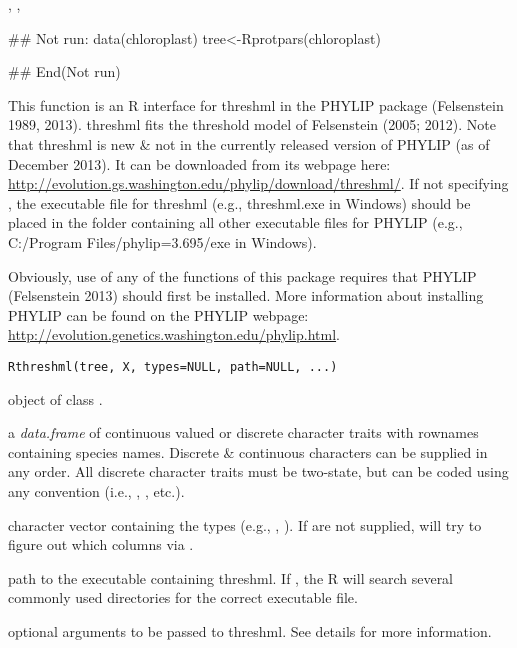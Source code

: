\documentclass[a4paper]{book}
\begin{document}
%
\begin{SeeAlso}\relax
{}, , 
\end{SeeAlso}
%
\begin{Examples}
\begin{ExampleCode}
## Not run: 
data(chloroplast)
tree<-Rprotpars(chloroplast)

## End(Not run)
\end{ExampleCode}
\end{Examples}
%
\begin{Description}\relax
This function is an R interface for threshml in the PHYLIP package (Felsenstein 1989, 2013). threshml fits the threshold model of Felsenstein (2005; 2012). Note that threshml is new \& not in the currently released version of PHYLIP (as of December 2013). It can be downloaded from its webpage here: \url{http://evolution.gs.washington.edu/phylip/download/threshml/}. If not specifying , the executable file for threshml (e.g., threshml.exe in Windows) should be placed in the folder containing all other executable files for PHYLIP (e.g., C:/Program Files/phylip=3.695/exe in Windows).

Obviously, use of any of the functions of this package requires that PHYLIP (Felsenstein 2013) should first be installed. More information about installing PHYLIP can be found on the PHYLIP webpage: \url{http://evolution.genetics.washington.edu/phylip.html}.
\end{Description}
%
\begin{Usage}
\begin{verbatim}
Rthreshml(tree, X, types=NULL, path=NULL, ...)
\end{verbatim}
\end{Usage}
%
\begin{Arguments}
\begin{ldescription}
\item[\code{tree}] object of class .
\item[\code{X}] a \emph{data.frame} of continuous valued or discrete character traits with rownames containing species names. Discrete \& continuous characters can be supplied in any order. All discrete character traits must be two-state, but can be coded using any convention (i.e., , , etc.).
\item[\code{types}] character vector containing the types (e.g., , ). If  are not supplied,  will try to figure out which columns via .
\item[\code{path}] path to the executable containing threshml. If , the R will search several commonly used directories for the correct executable file.
\item[\code{...}] optional arguments to be passed to threshml. See details for more information.
\end{ldescription}
\end{Arguments}
\end{document}

